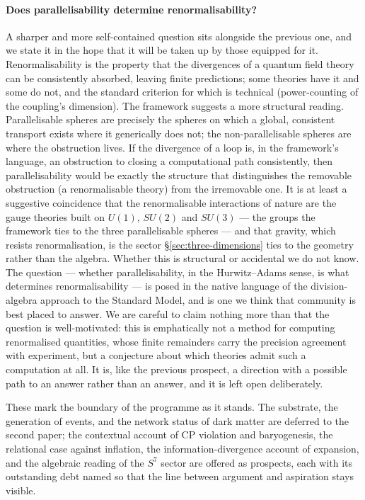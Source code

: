 \paragraph{Does parallelisability determine renormalisability?}
A sharper and more self-contained question sits alongside the previous one, and we state it in the
hope that it will be taken up by those equipped for it. Renormalisability is the property that the
divergences of a quantum field theory can be consistently absorbed, leaving finite predictions; some
theories have it and some do not, and the standard criterion for which is technical (power-counting
of the coupling's dimension). The framework suggests a more structural reading. Parallelisable
spheres are precisely the spheres on which a global, consistent transport exists where it generically
does not; the non-parallelisable spheres are where the obstruction lives. If the divergence of a loop
is, in the framework's language, an obstruction to closing a computational path consistently, then
parallelisability would be exactly the structure that distinguishes the removable obstruction (a
renormalisable theory) from the irremovable one. It is at least a suggestive coincidence that the
renormalisable interactions of nature are the gauge theories built on $U(1)$, $SU(2)$ and $SU(3)$ ---
the groups the framework ties to the three parallelisable spheres --- and that gravity, which resists
renormalisation, is the sector \S\ref{sec:three-dimensions} ties to the geometry rather than the
algebra. Whether this is structural or accidental we do not know. The question --- whether
parallelisability, in the Hurwitz--Adams sense, is what determines renormalisability --- is posed in
the native language of the division-algebra approach to the Standard Model, and is one we think that
community is best placed to answer. We are careful to claim nothing more than that the question is
well-motivated: this is emphatically not a method for computing renormalised quantities, whose finite
remainders carry the precision agreement with experiment, but a conjecture about which theories admit
such a computation at all. It is, like the previous prospect, a direction with a possible path to an
answer rather than an answer, and it is left open deliberately.


\medskip
\noindent These mark the boundary of the programme as it stands. The substrate,
the generation of events, and the network status of dark matter are deferred to
the second paper; the contextual account of CP violation and baryogenesis, the
relational case against inflation, the information-divergence account of
expansion, and the algebraic reading of the $S^{7}$ sector are offered as
prospects, each with its outstanding debt named so that the line between argument
and aspiration stays visible.